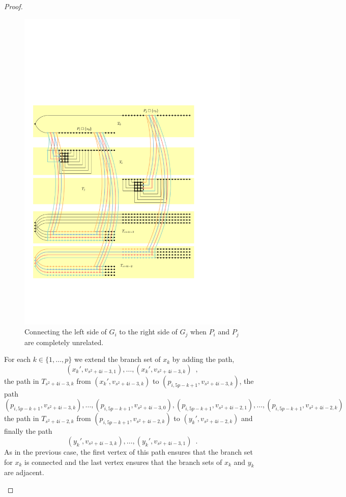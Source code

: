 \documentclass{patmorin}
\theoremstyle{plain}
\theoremstyle{definition}
\begin{document}
\begin{proof}
\begin{itemize}
     \begin{figure}[H]
      \begin{center}
        \includegraphics[scale=0.9]{figs/reverso}
      \end{center}
      \caption{Connecting the left side of $G_i$ to the right side of $G_j$ when $P_i$ and $P_j$ are completely unrelated.}
      \label{reverso}
    \end{figure}

    For each $k\in\{1,\ldots,p\}$ we extend the branch set of $x_k$ by adding the path,
    \[
      (x_k',v_{s^2+4i-3,1}),\ldots,(x_k',v_{s^2+4i-3,k}) \enspace ,
    \]
    the path in $T_{s^2+4i-3,k}$ from  $(x_k',v_{s^2+4i-3,k})$ to $(p_{i,5p-k+1},v_{s^2+4i-3,k})$, the path
    \[
      (p_{i,5p-k+1},v_{s^2+4i-3,k}),\ldots,(p_{i,5p-k+1},v_{s^2+4i-3,0}),(p_{i,5p-k+1},v_{s^2+4i-2,1}),\ldots,(p_{i,5p-k+1},v_{s^2+4i-2,k})
    \]
    the path in $T_{s^2+4i-2,k}$ from $(p_{i,5p-k+1},v_{s^2+4i-2,k})$ to $(y_k',v_{s^2+4i-2,k})$ and finally the path
    \[
      (y_k',v_{s^2+4i-3,k}),\ldots,(y_k',v_{s^2+4i-3,1}) \enspace .
    \]
    As in the previous case, the first vertex of this path ensures that the branch set for $x_k$ is connected and the last vertex ensures that the branch sets of $x_k$ and $y_k$ are adjacent.
  \end{itemize}



\end{proof}
\end{document}
